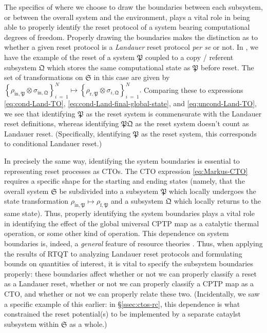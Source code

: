 \documentclass[preprints,article,accept,moreauthors,pdftex]{Definitions/mdpi}
\begin{document}
\begin{paracol}{2}
The specifics of where we choose to draw the boundaries between each subsystem, or between the overall system and the environment, plays a vital role in being able to properly identify the reset protocol of a system bearing computational degrees of freedom. Properly drawing the boundaries makes the distinction as to whether a given reset protocol is a \emph{Landauer} reset protocol \emph{per se} or not. In \cite{Anderson19}, we have the example of the reset of a system $\mathfrak{P}$ coupled to a copy / referent subsystem $\mathfrak{Q}$ which stores the same computational state as $\mathfrak{P}$ before reset. The set of transformations on $\mathfrak{S}$ in this case are given by $\left\{\rho_{\mathrm{in},\mathfrak{P}}\otimes\sigma_{\mathrm{in},\mathfrak{Q}}\right\}_{i\:=\:1}^{N}\mapsto\left\{\rho_{\mathrm{r},\mathfrak{P}}\otimes\sigma_{i,\mathfrak{Q}}\right\}_{i\:=\:1}^{N}.$ Comparing these to expressions \eqref{eq:cond-Land-TO}, \eqref{eq:cond-Land-final-global-state}, and \eqref{eq:uncond-Land-TO}, we see that identifying $\mathfrak{P}$ as the reset system is commensurate with the Landauer reset definitions, whereas identifying $\mathfrak{PQ}$ as the reset system doesn't count as Landauer reset. (Specifically, identifying $\mathfrak{P}$ as the reset system, this corresponds to conditional Landauer reset.)

In precisely the same way, identifying the system boundaries is essential to representing reset processes as CTOs. The CTO expression \eqref{eq:Markus-CTO} requires a specific shape for the starting and ending states (namely, that the overall system $\mathfrak{S}$ be subdivided into a subsystem $\mathfrak{P}$ which locally undergoes the state transformation $\rho_{\mathrm{in},\mathfrak{P}}\mapsto\rho_{\mathrm{f},\mathfrak{P}}$ and a subsystem $\mathfrak{Q}$ which locally returns to the same state). Thus, properly identifying the system boundaries plays a vital role in identifying the effect of the global universal CPTP map as a catalytic thermal operation, or some other kind of operation. This dependence on system boundaries is, indeed, a \emph{general} feature of resource theories \cite{CG19}. Thus, when applying the results of RTQT to analyzing Landauer reset protocols and formulating bounds on quantities of interest, it is vital to specify the subsystem boundaries properly: these boundaries affect whether or not we can properly classify a reset as a Landauer reset, whether or not we can properly classify a CPTP map as a CTO, and whether or not we can properly relate these two. (Incidentally, we saw a specific example of this earlier: in \S\ref{ssec:ctos-rc}, this dependence is what constrained the reset potential(s) to be implemented by a separate cataylst subsystem within $\mathfrak{S}$ as a whole.)


\end{paracol}
\end{document}
